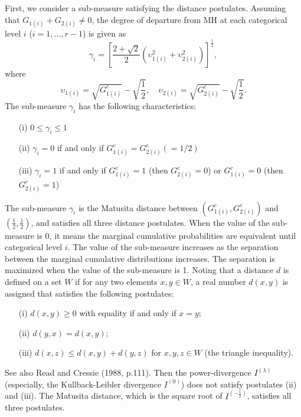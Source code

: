 \documentclass[a4j,12pt]{article}
\begin{document}
First, we consider a sub-measure satisfying the distance postulates. 
Assuming that $G_{1(i)} + G_{2(i)} \neq 0$, the degree of departure from MH at each categorical level $i$ ($i=1, \ldots, r-1$) is given as
\[
\gamma_i = \left[ \frac{2+\sqrt{2}}{2} \left( \upsilon_{1(i)}^2 + \upsilon_{2(i)}^2 \right)  \right]^{\frac{1}{2}},
\]
where
\[
\upsilon_{1(i)} = \sqrt{G^c_{1(i)}} - \sqrt{\frac{1}{2}},
\quad
\upsilon_{2(i)} = \sqrt{G^c_{2(i)}} - \sqrt{\frac{1}{2}}.
\]
The sub-measure $\gamma_i$ has the following characteristics:
\begin{enumerate}
\item[(i)] $0 \leq \gamma_i \leq 1$
\item[(ii)] $\gamma_i = 0$ if and only if $G^c_{1(i)} = G^c_{2(i)} (= 1/2)$
\item[(iii)] $\gamma_i = 1$ if and only if $G^c_{1(i)} =1$ (then $G^c_{2(i)} = 0$) or $G^c_{1(i)} =0$ (then $G^c_{2(i)} = 1$)
\end{enumerate}
The sub-measure $\gamma_i$ is the Matusita distance between $\left( G^c_{1(i)}, G^c_{2(i)} \right)$ and $\left( \frac{1}{2}, \frac{1}{2} \right)$, and satisfies all three distance postulates. 
When the value of the sub-measure is 0, it means the marginal cumulative probabilities are equivalent until categorical level $i$.
The value of the sub-measure increases as the separation between the marginal cumulative distributions increases. 
The separation is maximized when the value of the sub-measure is 1. 
Noting that a distance $d$ is defined on a set $W$ if for any two elements $x, y \in  W$, a real number $d(x, y)$ is assigned that satisfies the following postulates:
\begin{enumerate}
\item[(i)] $d(x, y) \geq  0$ with equality if and only if $x=y$;
\item[(ii)] $d(y, x) = d(x, y)$;
\item[(iii)] $d(x, z) \leq d(x, y) + d(y, z)$ for $x, y, z \in  W$ (the triangle inequality).
\end{enumerate}
See also Read and Cressie (1988, p.111).
Then the power-divergence $I^{(\lambda)}$ (especially, the Kullback-Leibler divergence $I^{(0)}$) does not satisfy postulates (ii) and (iii). 
The Matusita distance, which is the square root of $I^{(-\frac{1}{2})}$, satisfies all three postulates. 
\end{document}
